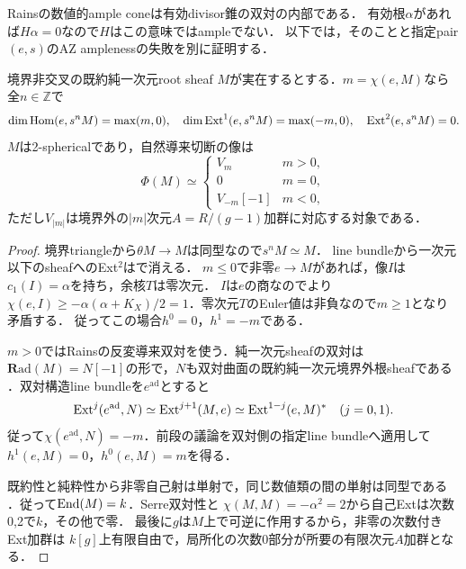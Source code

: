Rainsの数値的ample coneは有効divisor錐の双対の内部である\cite[\S4]{Filtered}．
有効根$\alpha$があれば$H\alpha=0$なので$H$はこの意味ではampleでない．
以下では，そのことと指定pair $(e,s)$のAZ amplenessの失敗を別に証明する．

\begin{theorem}[既約根sheafの符号別Ext]\label{thm:sign}
境界非交叉の既約純一次元root sheaf $M$が実在するとする．$m=\chi(e,M)$なら全$n\in\mathbb Z$で
\[
\dim\operatorname{Hom}(e,s^nM)=\max(m,0),\quad
\dim\operatorname{Ext}^1(e,s^nM)=\max(-m,0),\quad\operatorname{Ext}^2(e,s^nM)=0.
\]
$M$は2-sphericalであり，自然導来切断の像は
\[
\Phi(M)\simeq
\begin{cases}
V_m & m>0,\\ 0&m=0,\\V_{-m}[-1]&m<0,
\end{cases}
\]
ただし$V_{|m|}$は境界外の$|m|$次元$A=R/(g-1)$加群に対応する対象である．
\end{theorem}
\begin{proof}
境界triangleから$\theta M\to M$は同型なので$s^nM\simeq M$．
line bundleから一次元以下のsheafへのExt$^2$は\cite[Corollary 7.23]{Rains}で消える．
$m\le0$で非零$e\to M$があれば，像$I$は$c_1(I)=\alpha$を持ち，余核$T$は零次元．
$I$は$e$の商なので\cite[Corollary 10.16]{Rains}より
$\chi(e,I)\ge-\alpha(\alpha+K_X)/2=1$．零次元$T$のEuler値は非負なので$m\ge1$となり矛盾する．
従ってこの場合$h^0=0$，$h^1=-m$である．

$m>0$ではRainsの反変導来双対を使う．純一次元sheafの双対は
$\mathbf R\mathrm{ad}(M)=N[-1]$の形で，$N$も双対曲面の既約純一次元境界外根sheafである
\cite[Corollaries 5.9, 7.26, 7.30, 7.31]{Rains}．双対構造line bundleを$e^{\mathrm{ad}}$とすると
\[
\operatorname{Ext}^j(e^{\mathrm{ad}},N)\simeq\operatorname{Ext}^{j+1}(M,e)
\simeq\operatorname{Ext}^{1-j}(e,M)^*\quad(j=0,1).
\]
従って$\chi(e^{\mathrm{ad}},N)=-m$．前段の議論を双対側の指定line bundleへ適用して
$h^1(e,M)=0$，$h^0(e,M)=m$を得る．

既約性と純粋性から非零自己射は単射で，同じ数値類の間の単射は同型である
\cite[Corollary 7.7]{Rains}．従って$\operatorname{End}(M)=k$．Serre双対性と
$\chi(M,M)=-\alpha^2=2$から自己Extは次数0,2で$k$，その他で零．
最後に$g$は$M$上で可逆に作用するから，非零の次数付きExt加群は
$k[g]$上有限自由で，局所化の次数0部分が所要の有限次元$A$加群となる．
\end{proof}


